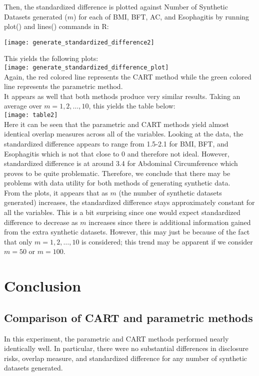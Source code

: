 \documentclass[12pt]{article}
\begin{document}
Then, the standardized difference is plotted against Number of Synthetic Datasets generated ($m$) for each of BMI, BFT, AC, and Esophagitis by running plot() and lines() commands in R:\\
\begin{center}
	\texttt{[image: generate\_standardized\_difference2]}\\
\end{center}
This yields the following plots:\\
\texttt{[image: generate\_standardized\_difference\_plot]}\\

Again, the red colored line represents the CART method while the green colored line represents the parametric method.\\

It appears as well that both methods produce very similar results. Taking an average over $m=1,2,\dots, 10$, this yields the table below: \\
\texttt{[image: table2]}\\

Here it can be seen that the parametric and CART methods yield almost identical overlap measures across all of the variables. Looking at the data, the standardized difference appears to range from 1.5-2.1 for BMI, BFT, and Esophagitis which is not that close to 0 and therefore not ideal. However, standardized difference is at around 3.4 for Abdominal Circumference which proves to be quite problematic. Therefore, we conclude that there may be problems with data utility for both methods of generating synthetic data.\\

From the plots, it appears that as $m$ (the number of synthetic datasets generated) increases, the standardized difference stays approximately constant for all the variables. This is a bit surprising since one would expect standardized difference to decrease as $m$ increases since there is additional information gained from the extra synthetic datasets. However, this may just be because of the fact that only $m=1,2,\dots, 10$ is considered; this trend may be apparent if we consider $m=50$ or $m=100$. 

\section*{Conclusion}

\subsection*{Comparison of CART and parametric methods}
In this experiment, the parametric and CART methods performed nearly identically well. In particular, there were no substantial differences in disclosure risks, overlap measure, and standardized difference for any number of synthetic datasets generated.
\end{document}
